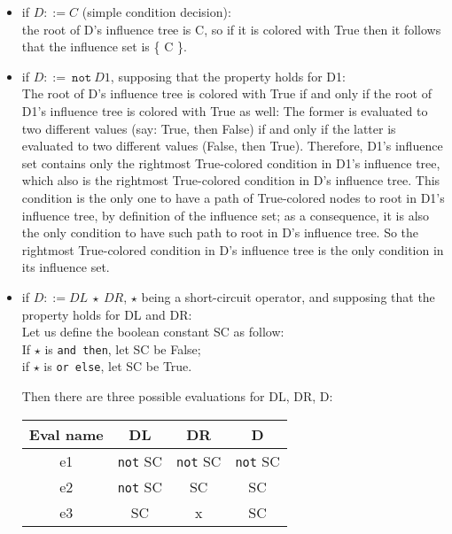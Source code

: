 \documentclass[a4paper,12pt,twoside]{article}
\newcommand{\anysc}{\star}
\newcommand{\andthen}{\texttt{and then}}
\newcommand{\orelse}{\texttt{or else}}
\newcommand{\adanot}{\texttt{not}}
\begin{document}
\begin{itemize}

\item if $D ::= C$ (simple condition decision):\\
  the root of D's influence tree is C, so if it is colored with True then
  it follows that the influence set is \{ C \}.

\item if $D ::=\ \adanot{} \ D1$, supposing that the property holds for D1:\\
  The root of D's influence tree is colored with True if and only if
  the root of D1's influence tree is colored with True as well: The
  former is evaluated to two different values (say: True, then False)
  if and only if the latter is evaluated to two different values
  (False, then True). Therefore, D1's influence set contains only the
  rightmost True-colored condition in D1's influence tree, which also
  is the rightmost True-colored condition in D's influence tree.  This
  condition is the only one to have a path of True-colored nodes to
  root in D1's influence tree, by definition of the influence set; as
  a consequence, it is also the only condition to have such path to
  root in D's influence tree. So the rightmost True-colored condition
  in D's influence tree is the only condition in its influence set.

\item if $D ::= DL \ \anysc{} \ DR$, $\anysc{}$ being a short-circuit operator,
  and supposing that the property holds for DL and DR:\\

  Let us define the boolean constant SC as follow:\\
  If $\anysc{}$ is \andthen{}, let SC be False;\\
  if $\anysc{}$ is \orelse{}, let SC be True.

  Then there are three possible evaluations for DL, DR, D:

\begin{center}
\begin{tabular}{|c|c|c||c|}
\hline
Eval name & DL            & DR            & D                    \\ \hline
e1        & \adanot{} SC  & \adanot{} SC  & \adanot{} SC         \\ \hline
e2        & \adanot{} SC  & SC            & SC                   \\ \hline
e3        & SC            & x             & SC                   \\ \hline
\end{tabular}
\end{center}


\end{itemize}
\end{document}
